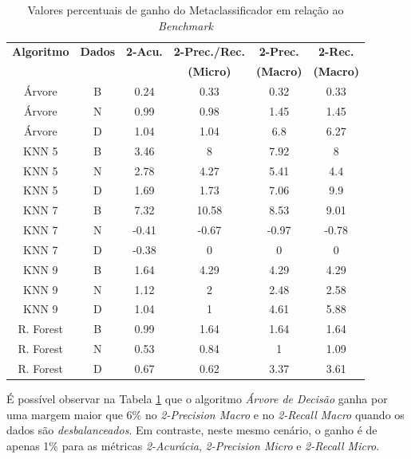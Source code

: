 \begin{table}[h!]
  \begin{center}
   \resizebox{\textwidth}{!} {
   \begin{tabular}{cccccc}
      \hline
      \textbf{Algoritmo} & \textbf{Dados} &  \textbf{2-Acu.} & \textbf{2-Prec./Rec.} & \textbf{2-Prec.} & \textbf{2-Rec.} \\
          &     &     & \textbf{(Micro)} & \textbf{(Macro)} & \textbf{(Macro)} \\
      \hline


Árvore	&	B	&	0.24	&	0.33	&	0.32	&	0.33	\\
Árvore	&	N	&	0.99	&	0.98	&	1.45	&	1.45	\\
Árvore	&	D	&	1.04	&	1.04	&	6.8	&	6.27	\\
KNN 5	&	B	&	3.46	&	8	&	7.92	&	8	\\
KNN 5	&	N	&	2.78	&	4.27	&	5.41	&	4.4	\\
KNN 5	&	D	&	1.69	&	1.73	&	7.06	&	9.9	\\
KNN 7	&	B	&	7.32	&	10.58	&	8.53	&	9.01	\\
KNN 7	&	N	&	-0.41	&	-0.67	&	-0.97	&	-0.78	\\
KNN 7	&	D	&	-0.38	&	0	&	0	&	0	\\
KNN 9	&	B	&	1.64	&	4.29	&	4.29	&	4.29	\\
KNN 9	&	N	&	1.12	&	2	&	2.48	&	2.58	\\
KNN 9	&	D	&	1.04	&	1	&	4.61	&	5.88	\\
R. Forest	&	B	&	0.99	&	1.64	&	1.64	&	1.64	\\
R. Forest	&	N	&	0.53	&	0.84	&	1	&	1.09	\\
R. Forest	&	D	&	0.67	&	0.62	&	3.37	&	3.61	\\

      \hline
    \end{tabular}
    }
    \caption{Valores percentuais de ganho do Metaclassificador em relação ao \textit{Benchmark}}
    \label{tab:ganho_meta}
  \end{center}
\end{table}

É possível observar na Tabela \ref{tab:ganho_meta} que o algoritmo \textit{Árvore de Decisão } ganha por uma margem maior que 6\% no \textit{2-Precision Macro} e no \textit{2-Recall Macro} quando os dados são \textit{desbalanceados}.
Em contraste, neste mesmo cenário, o ganho é de apenas 1\% para as métricas \textit{2-Acurácia}, \textit{2-Precision Micro} e \textit{2-Recall Micro}.

